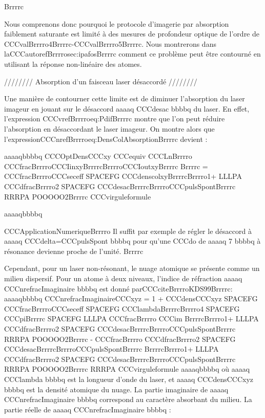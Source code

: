 Brrrrc


Nous comprenons donc pourquoi le protocole d'imagerie par absorption faiblement saturante est limité à des mesures de profondeur optique de l'ordre de CCCvalBrrrro4Brrrrc-CCCvalBrrrro5Brrrrc.
Nous montrerons dans laCCCautorefBrrrrosec:ipafosBrrrrc comment ce problème peut être contourné en utilisant la réponse non-linéaire des atomes.

//////// Absorption d'un faisceau laser désaccordé ////////

Une manière de contourner cette limite est de diminuer l'absorption du laser imageur en jouant sur le désaccord aaaaq CCCdesac bbbbq du laser. En effet, l'expression CCCvrefBrrrroeq:PdifBrrrrc montre que l'on peut réduire l'absorption en désaccordant le laser imageur. On montre alors que l'expressionCCCnrefBrrrroeq:DensColAbsorptionBrrrrc devient :



aaaaqbbbbq
	CCCOptDensCCCxy 
	CCCequiv 	CCCLnBrrrro	CCCfracBrrrroCCCIinxyBrrrrcBrrrroCCCIoutxyBrrrrc	Brrrrc
	= CCCfracBrrrroCCCseceff SPACEFG CCCdenscolxyBrrrrcBrrrro1+ LLLPA CCCdfracBrrrro2 SPACEFG CCCdesacBrrrrcBrrrroCCCpulsSpontBrrrrc RRRPA POOOOO2Brrrrc 
CCCvirguleformule
	
aaaaqbbbbq




CCCApplicationNumeriqueBrrrro
Il suffit par exemple de régler le désaccord à aaaaq CCCdelta=CCCpulsSpont bbbbq pour qu'une CCCdo de aaaaq 7 bbbbq à résonance devienne proche de l'unité. 
Brrrrc


Cependant, pour un laser non-résonant, le nuage atomique se présente comme un milieu dispersif. Pour un atome à deux niveaux, l'indice de réfraction aaaaq CCCnrefracImaginaire bbbbq est donné parCCCciteBrrrroKDS99Brrrrc:
aaaaqbbbbq
	CCCnrefracImaginaireCCCxyz 
= 1 + CCCdensCCCxyz  SPACEFG  CCCfracBrrrroCCCseceff SPACEFG CCClambdaBrrrrcBrrrro4 SPACEFG CCCpiBrrrrc 
 SPACEFG   LLLPA 
CCCfracBrrrro CCCim BrrrrcBrrrro1+ LLLPA CCCdfracBrrrro2 SPACEFG CCCdesacBrrrrcBrrrroCCCpulsSpontBrrrrc RRRPA POOOOO2Brrrrc
-
CCCfracBrrrro CCCdfracBrrrro2 SPACEFG CCCdesacBrrrrcBrrrroCCCpulsSpontBrrrrc BrrrrcBrrrro1+ LLLPA CCCdfracBrrrro2 SPACEFG CCCdesacBrrrrcBrrrroCCCpulsSpontBrrrrc RRRPA POOOOO2Brrrrc
 RRRPA 
CCCvirguleformule
aaaaqbbbbq
où aaaaq CCClambda bbbbq est la longueur d'onde du laser, et aaaaq CCCdensCCCxyz bbbbq est la densité atomique du nuage. La partie imaginaire de aaaaq CCCnrefracImaginaire bbbbq correspond au caractère absorbant du milieu. La partie réelle de aaaaq CCCnrefracImaginaire bbbbq :



